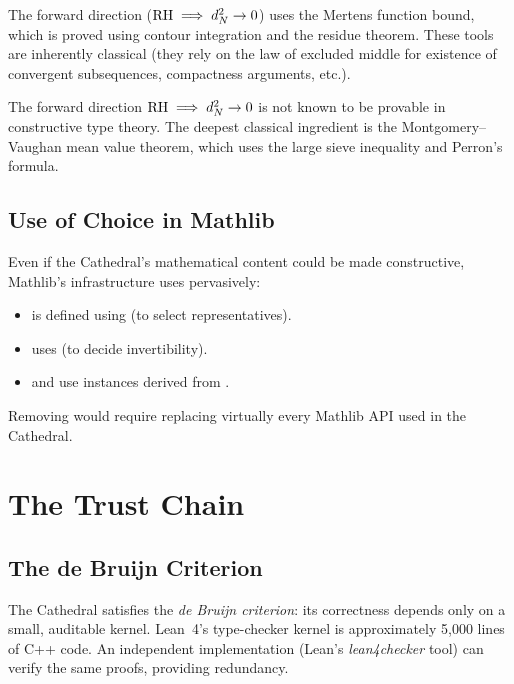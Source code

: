\documentclass[11pt,a4paper]{article}
\begin{document}
The forward direction ($\mathrm{RH} \implies d_N^2 \to 0$) uses the Mertens
function bound, which is proved using contour integration and the
residue theorem. These tools are inherently classical (they rely on
the law of excluded middle for existence of convergent subsequences,
compactness arguments, etc.).

\begin{proposition}
The forward direction $\mathrm{RH} \implies d_N^2 \to 0$ is not known to be
provable in constructive type theory. The deepest classical ingredient
is the Montgomery--Vaughan mean value theorem, which uses the large
sieve inequality and Perron's formula.
\end{proposition}

\subsection{Use of Choice in Mathlib}

Even if the Cathedral's mathematical content could be made constructive,
Mathlib's infrastructure uses  pervasively:

\begin{itemize}
  \item {} is defined using
     (to select representatives).
  \item {} uses 
    (to decide invertibility).
  \item {} and  use 
    instances derived from .
\end{itemize}

Removing  would require replacing virtually every
Mathlib API used in the Cathedral.

\section{The Trust Chain}
\label{sec:trust}

\subsection{The de Bruijn Criterion}

The Cathedral satisfies the \emph{de Bruijn criterion}: its
correctness depends only on a small, auditable kernel. Lean~4's
type-checker kernel is approximately 5{,}000 lines of C++ code. An
independent implementation (Lean's \emph{lean4checker} tool) can
verify the same proofs, providing redundancy.
\end{document}
